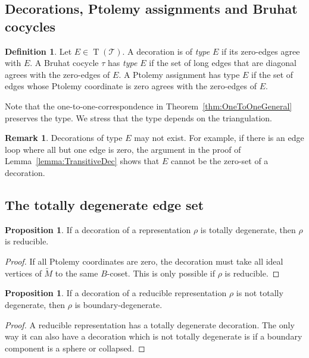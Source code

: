 \documentclass[11pt]{amsart}
\theoremstyle{plain}
\theoremstyle{definition}
\newtheorem{proposition}[theorem]{Proposition}
\newtheorem{definition}[theorem]{Definition}
\newtheorem{remark}[theorem]{Remark}
\numberwithin{equation}{section}
\newcommand{\T}{\mathcal T}
\DeclareMathOperator{\TE}{T}
\begin{document}
\subsection{Decorations, Ptolemy assignments and Bruhat cocycles}
\begin{definition} Let $E\in\TE(\T)$. A decoration is of \emph{type $E$} if its zero-edges agree with $E$. A Bruhat cocycle $\tau$ has \emph{type $E$} if the set of long edges that are diagonal agrees with the zero-edges of $E$. A Ptolemy assignment has type $E$ if the set of edges whose Ptolemy coordinate is zero agrees with the zero-edges of $E$.
\end{definition}
Note that the one-to-one-correspondence in Theorem~\ref{thm:OneToOneGeneral} preserves the type. We stress that the type depends on the triangulation.
\begin{remark}
Decorations of type $E$ may not exist. For example, if there is an edge loop where all but one edge is zero, the argument in the proof of Lemma~\ref{lemma:TransitiveDec} shows that $E$ cannot be the zero-set of a decoration.
\end{remark}



\subsection{The totally degenerate edge set}\label{sec:TotallyDegenerate}
\begin{proposition}\label{prop:TotallyDegenerate}
If a decoration of a representation $\rho$ is totally degenerate, then $\rho$ is reducible.
\end{proposition}
\begin{proof} If all Ptolemy coordinates are zero, the decoration must take all ideal vertices of $\widetilde M$ to the same $B$-coset. This is only possible if $\rho$ is reducible.
\end{proof}
\begin{proposition}\label{prop:ReducibleDegenerate} If a decoration of a reducible representation $\rho$ is not totally degenerate, then $\rho$ is boundary-degenerate. 
\end{proposition}
\begin{proof} A reducible representation has a totally degenerate decoration. The only way it can also have a decoration which is not totally degenerate is if a boundary component is a sphere or collapsed.
\end{proof}
\end{document}
